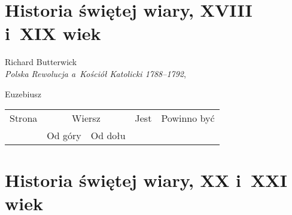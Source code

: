 \documentclass[a4paper,11pt]{article}
\begin{document}
\newpage

\section{Historia świętej wiary, XVIII i~XIX wiek}



{ %
  Richard Butterwick \\
  \textit{Polska Rewolucja a~Kościół Katolicki 1788--1792},
  \cite{ButterwickPolskaRewolucjaAKosciolKatolicki2012}}

\vspace{0em}



\vspace{0em}


\noindent
{} Euzebiusz \\




\begin{center}

  \begin{tabular}{|c|c|c|c|c|}
    \hline
    Strona & \multicolumn{2}{c|}{Wiersz} & Jest
                              & Powinno być \\ \cline{2-3}
    & Od góry & Od dołu & & \\
    \hline
    \hline
  \end{tabular}

\end{center}

\vspace{\spaceTwo}












\newpage

\section{Historia świętej wiary, XX i~XXI wiek}
\end{document}
